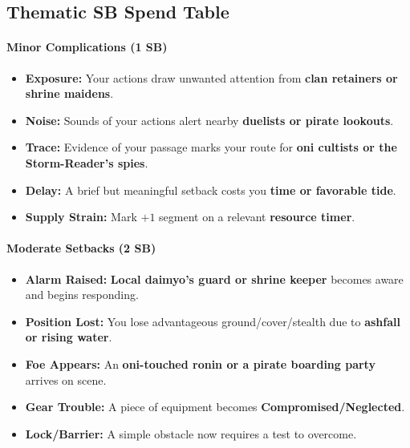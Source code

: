 \subsection*{Thematic SB Spend Table}
\label{sec:nihori-sb}

\paragraph{Minor Complications (1 SB)}
\begin{itemize}
\item \textbf{Exposure:} Your actions draw unwanted attention from \textbf{clan retainers or shrine maidens}.
\item \textbf{Noise:} Sounds of your actions alert nearby \textbf{duelists or pirate lookouts}.
\item \textbf{Trace:} Evidence of your passage marks your route for \textbf{oni cultists or the Storm-Reader's spies}.
\item \textbf{Delay:} A brief but meaningful setback costs you \textbf{time or favorable tide}.
\item \textbf{Supply Strain:} Mark $+1$ segment on a relevant \textbf{resource timer}.
\end{itemize}

\paragraph{Moderate Setbacks (2 SB)}
\begin{itemize}
\item \textbf{Alarm Raised:} \textbf{Local daimyo's guard or shrine keeper} becomes aware and begins responding.
\item \textbf{Position Lost:} You lose advantageous ground/cover/stealth due to \textbf{ashfall or rising water}.
\item \textbf{Foe Appears:} An \textbf{oni-touched ronin or a pirate boarding party} arrives on scene.
\item \textbf{Gear Trouble:} A piece of equipment becomes \textbf{Compromised/Neglected}.
\item \textbf{Lock/Barrier:} A simple obstacle now requires a test to overcome.
\end{itemize}

